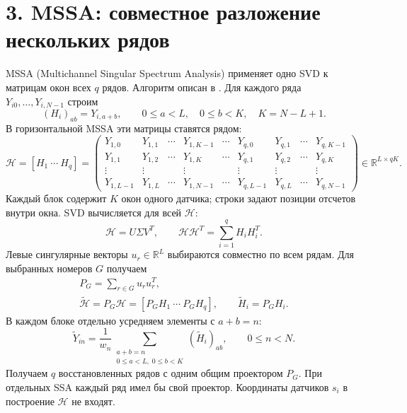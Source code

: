 \documentclass[11pt,a4paper]{article}
\begin{document}
\section*{3. MSSA: совместное разложение нескольких рядов}
MSSA (Multichannel Singular Spectrum Analysis) применяет одно SVD
к матрицам окон всех $q$ рядов. Алгоритм описан в
\cite[раздел 1.1, с.~294--295]{mssa}.
Для каждого ряда $Y_{i0},\ldots,Y_{i,N-1}$ строим
\[
 (H_i)_{ab}=Y_{i,a+b},\qquad
 0\leq a<L,\quad 0\leq b<K,\quad K=N-L+1.
\]
В горизонтальной MSSA эти матрицы ставятся рядом:
\[
 \mathcal H=[H_1\ \cdots\ H_q]
 =\left(\begin{array}{cccc|c|cccc}
 Y_{1,0}&Y_{1,1}&\cdots&Y_{1,K-1}&\cdots&
 Y_{q,0}&Y_{q,1}&\cdots&Y_{q,K-1}\\
 Y_{1,1}&Y_{1,2}&\cdots&Y_{1,K}&\cdots&
 Y_{q,1}&Y_{q,2}&\cdots&Y_{q,K}\\
 \vdots&\vdots&&\vdots&&\vdots&\vdots&&\vdots\\
 Y_{1,L-1}&Y_{1,L}&\cdots&Y_{1,N-1}&\cdots&
 Y_{q,L-1}&Y_{q,L}&\cdots&Y_{q,N-1}
 \end{array}\right)
 \in\mathbb R^{L\times qK}.
\]
Каждый блок содержит $K$ окон одного датчика; строки задают позиции
отсчетов внутри окна. SVD вычисляется для всей $\mathcal H$:
\[
 \mathcal H=U\Sigma V^T,\qquad
 \mathcal H\mathcal H^T=\sum_{i=1}^qH_iH_i^T.
\]
Левые сингулярные векторы $u_r\in\mathbb R^L$ выбираются совместно
по всем рядам. Для выбранных номеров $G$ получаем
\begin{gather*}
 P_G=\sum_{r\in G}u_ru_r^T,\\
 \widetilde{\mathcal H}=P_G\mathcal H
 =[P_GH_1\ \cdots\ P_GH_q],\qquad
 \widetilde H_i=P_GH_i.
\end{gather*}
В каждом блоке отдельно усредняем элементы с $a+b=n$:
\[
 \widetilde Y_{in}
 =\frac1{w_n}\sum_{\substack{a+b=n\\0\leq a<L,\;0\leq b<K}}
 (\widetilde H_i)_{ab},\qquad 0\leq n<N.
\]
Получаем $q$ восстановленных рядов с одним общим проектором $P_G$.
При отдельных SSA каждый ряд имел бы свой проектор.
Координаты датчиков $s_i$ в построение $\mathcal H$ не входят.
\end{document}

